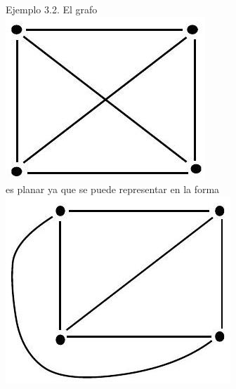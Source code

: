 \documentclass[10pt]{article}
\begin{document}
Ejemplo 3.2. El grafo\\
\includegraphics[max width=\textwidth, center]{2025_09_05_93c7c1835f249f70c0eeg-06(4)}\\
es planar ya que se puede representar en la forma\\
\includegraphics[max width=\textwidth, center]{2025_09_05_93c7c1835f249f70c0eeg-06}
\end{document}
